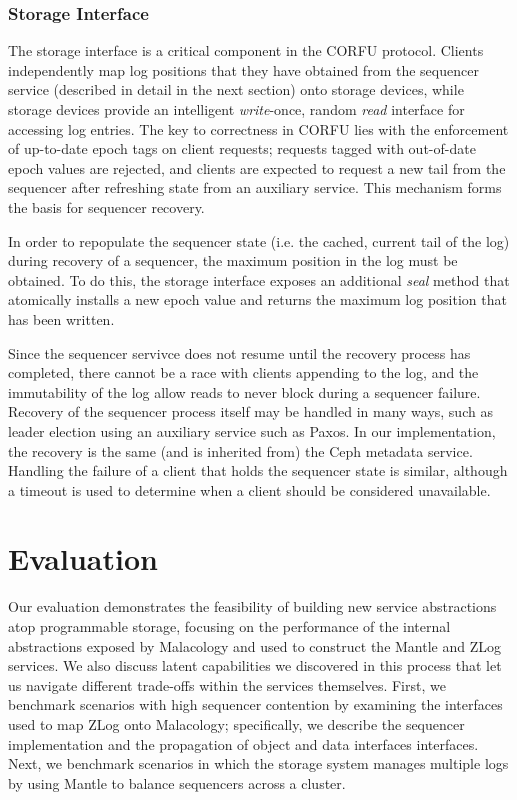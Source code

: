 \documentclass[preprint]{sigplanconf-eurosys}
\begin{document}
\subsubsection{Storage Interface}

The storage interface is a critical component in the CORFU protocol. Clients
independently map log positions that they have obtained from the sequencer
service (described in detail in the next section) onto storage devices, while
storage devices provide an intelligent \emph{write}-once, random \emph{read}
interface for accessing log entries. The key to correctness in CORFU lies with
the enforcement of up-to-date epoch tags on client requests; requests tagged
with out-of-date epoch values are rejected, and clients are expected to
request a new tail from the sequencer after refreshing state from an auxiliary
service.  This mechanism forms the basis for sequencer recovery.

In order to repopulate the sequencer state (i.e. the cached, current tail of
the log) during recovery of a sequencer, the maximum position in the log must
be obtained. To do this, the storage interface exposes an additional
\emph{seal} method that atomically installs a new epoch value and returns the
maximum log position that has been written.

Since the sequencer servivce does not resume until the recovery process has
completed, there cannot be a race with clients appending to the log, and the
immutability of the log allow reads to never block during a sequencer failure.
Recovery of the sequencer process itself may be handled in many ways, such as
leader election using an auxiliary service such as Paxos. In our
implementation, the recovery is the same (and is inherited from) the Ceph
metadata service. Handling the failure of a client that holds the sequencer
state is similar, although a timeout is used to determine when a client should
be considered unavailable.

\section{Evaluation}
\label{sec:evaluation} 


Our evaluation demonstrates the feasibility of building new service
abstractions atop programmable storage, focusing on the performance of the
internal abstractions exposed by Malacology and used to construct the Mantle
and ZLog services. We also discuss latent capabilities we discovered in this
process that let us navigate different trade-offs within the services
themselves. First, we benchmark scenarios with high sequencer contention by
examining the interfaces used to map ZLog onto Malacology; specifically, we
describe the sequencer implementation and the propagation of object and data
interfaces interfaces.  Next, we benchmark scenarios in which the storage
system manages multiple logs by using Mantle to balance sequencers across a
cluster.
\end{document}
